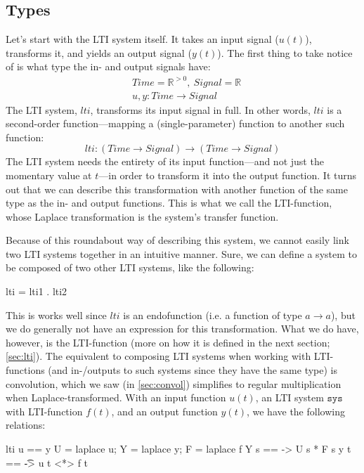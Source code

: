 \subsection{Types}\label{sec:tftypes}
\begin{newtext}
Let's start with the LTI system itself. It takes an input signal ($u(t)$), transforms it, and yields an output signal ($y(t)$). The first thing to take notice of is what type the in- and output signals have:
\begin{align*}
    &Time = \mathbb{R}^{>0},~ Signal = \mathbb{R} \\
    &u, y : Time \rightarrow Signal
\end{align*}
The LTI system, $lti$, transforms its input signal in full. In other words, $lti$ is a second-order function---mapping a (single-parameter) function to another such function:
\begin{equation*}
    lti : (Time \rightarrow Signal) \rightarrow (Time \rightarrow Signal)
\end{equation*}
The LTI system needs the entirety of its input function---and not just the momentary value at $t$---in order to transform it into the output function.
It turns out that we can describe this transformation with another function of the same type as the in- and output functions. This is what we call the LTI-function, whose Laplace transformation is the system's transfer function.

Because of this roundabout way of describing this system, we cannot easily link two LTI systems together in an intuitive manner. Sure, we can define a system to be composed of two other LTI systems, like the following: 
\begin{codeeq}
lti = lti1 . lti2
\end{codeeq}
This is works well since $lti$ is an endofunction (i.e. a function of type $a\rightarrow a$), but we do generally not have an expression for this transformation. What we do have, however, is the LTI-function (more on how it is defined in the next section; \ref{sec:lti}). The equivalent to composing LTI systems when working with LTI-functions (and in-/outputs to such systems since they have the same type) is convolution, which we saw (in \ref{sec:convol}) simplifies to regular multiplication when Laplace-transformed.
With an input function $u(t)$, an LTI system $\texttt{sys}$ with LTI-function $f(t)$, and an output function $y(t)$, we have the following relations:
\begin{codeeq}
lti u == y
U = laplace u; Y = laplace y; F = laplace f
Y s == \s -> U s * F s
y t == \t -> u t <*> f t
\end{codeeq}
\end{newtext}

